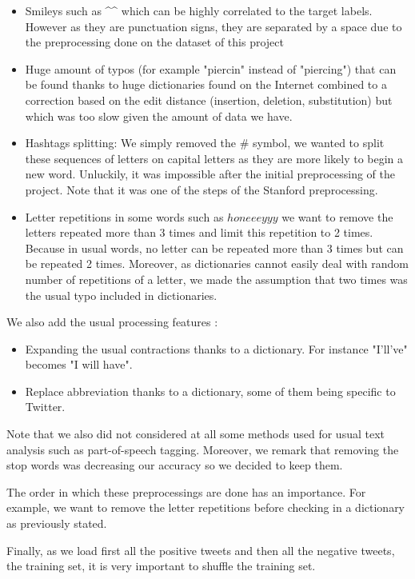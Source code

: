 \documentclass[10pt,conference,compsocconf]{IEEEtran}
\begin{document}
\begin{itemize}
    \item Smileys such as \^{}\^{}  which can be highly correlated to the target labels. However as they are punctuation signs, they are separated by a space due to the preprocessing done on the dataset of this project
    \item Huge amount of typos (for example "piercin" instead of "piercing") that can be found thanks to huge dictionaries found on the Internet combined to a correction based on the edit distance (insertion, deletion, substitution) but which was too slow given the amount of data we have.
    \item Hashtags splitting: We simply removed the \# symbol, we wanted to split these sequences of letters on capital letters as they are more likely to begin a new word. Unluckily, it was impossible after the initial preprocessing of the project. Note that it was one of the steps of the Stanford preprocessing.
    \item Letter repetitions in some words such as $honeeeyyy$ we want to remove the letters repeated more than 3 times and limit this repetition to 2 times. Because in usual words, no letter can be repeated more than 3 times but can be repeated 2 times. Moreover, as dictionaries cannot easily deal with random number of repetitions of a letter, we made the assumption that two times was the usual typo included in dictionaries.
\end{itemize}

We also add the usual processing features : 
\begin{itemize}
    \item Expanding the usual contractions thanks to a dictionary. For instance "I'll've" becomes "I will have".
    \item Replace abbreviation thanks to a dictionary, some of them being specific to Twitter.
\end{itemize}

Note that we also did not considered at all some methods used for usual text analysis such as part-of-speech tagging. Moreover, we remark that removing the stop words was decreasing our accuracy so we decided to keep them.

The order in which these preprocessings are done has an importance. For example, we want to remove the letter repetitions before checking in a dictionary as previously stated.

Finally, as we load first all the positive tweets and then all the negative tweets, the training set, it is very important to shuffle the training set.
\end{document}
